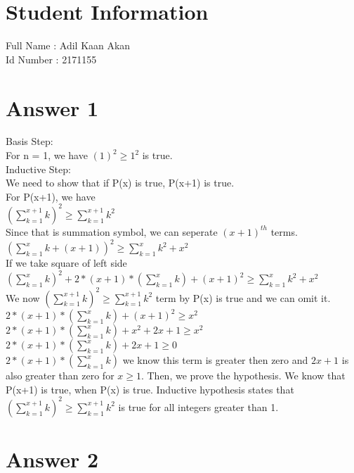 \documentclass[12pt]{article}
\begin{document}
\section*{Student Information } 
Full Name :  Adil Kaan Akan\\
Id Number :  2171155\\

\section*{Answer 1}
Basis Step: \\
For n = 1, we have
$(1)^2 \geq 1^2$ is true. \\
Inductive Step: \\
We need to show that if P(x) is true, P(x+1) is true. \\
For P(x+1), we have \\
$(\sum_{k = 1}^{x+1} k)^2 \geq \sum_{k=1}^{x+1}{k^2}$ \\
Since that is summation symbol, we can seperate $(x+1)^{th}$ terms. \\
$(\sum_{k = 1}^{x} k + (x+1))^2 \geq \sum_{k=1}^{x}{k^2 + x^2}$ \\
If we take square of left side \\
$(\sum_{k = 1}^{x} k)^2 + 2*(x+1)*(\sum_{k = 1}^{x} k)+(x+1)^2 \geq \sum_{k=1}^{x}{k^2 + x^2}$ \\
We now $(\sum_{k = 1}^{x+1} k)^2 \geq \sum_{k=1}^{x+1}{k^2}$ term by P(x) is true and we can omit it.
$2*(x+1)*(\sum_{k = 1}^{x} k)+(x+1)^2 \geq  x^2$ \\
$2*(x+1)*(\sum_{k = 1}^{x} k)+x^2 + 2x + 1  \geq  x^2$ \\
$2*(x+1)*(\sum_{k = 1}^{x} k) + 2x + 1  \geq  0$ \\
$2*(x+1)*(\sum_{k = 1}^{x} k)$ we know this term is greater then zero and $2x+1$ is also greater than zero for $x \geq 1$. Then, we prove the hypothesis.
We know that P(x+1) is true, when P(x) is true. Inductive hypothesis states that $(\sum_{k = 1}^{x+1} k)^2 \geq \sum_{k=1}^{x+1}{k^2}$ is true for all integers greater than 1.


\section*{Answer 2}
\end{document}
